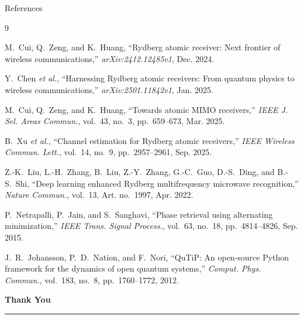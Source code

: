 \documentclass[10pt,xcolor=x11names,compress,aspectratio=169]{beamer}
\begin{document}
\begin{frame}{References}
\scriptsize
\begin{thebibliography}{9}

M.~Cui, Q.~Zeng, and K.~Huang, ``Rydberg atomic receiver: Next frontier of wireless
communications,'' \textit{arXiv:2412.12485v1}, Dec. 2024.

Y.~Chen \textit{et al.}, ``Harnessing Rydberg atomic receivers: From quantum physics to
wireless communications,'' \textit{arXiv:2501.11842v1}, Jan. 2025.

M.~Cui, Q.~Zeng, and K.~Huang, ``Towards atomic MIMO receivers,'' \textit{IEEE J. Sel.
Areas Commun.}, vol.~43, no.~3, pp.~659--673, Mar. 2025.

B.~Xu \textit{et al.}, ``Channel estimation for Rydberg atomic receivers,''
\textit{IEEE Wireless Commun. Lett.}, vol.~14, no.~9, pp.~2957--2961, Sep. 2025.

Z.-K.~Liu, L.-H.~Zhang, B.~Liu, Z.-Y.~Zhang, G.-C.~Guo, D.-S.~Ding, and B.-S.~Shi, ``Deep
learning enhanced Rydberg multifrequency microwave recognition,'' \textit{Nature Commun.},
vol.~13, Art. no.~1997, Apr. 2022.

P.~Netrapalli, P.~Jain, and S.~Sanghavi, ``Phase retrieval using alternating
minimization,'' \textit{IEEE Trans. Signal Process.}, vol.~63, no.~18, pp.~4814--4826,
Sep. 2015.

J.~R.~Johansson, P.~D.~Nation, and F.~Nori, ``QuTiP: An open-source Python framework for the
dynamics of open quantum systems,'' \textit{Comput. Phys. Commun.}, vol.~183, no.~8,
pp.~1760--1772, 2012.

\end{thebibliography}
\end{frame}

\begin{frame}[plain]
\begin{center}
  \vspace{1.5cm}
  {\Huge\textbf{Thank You}}\\[10pt]
  \rule{6cm}{0.5pt}
\end{center}
\end{frame}
\end{document}
